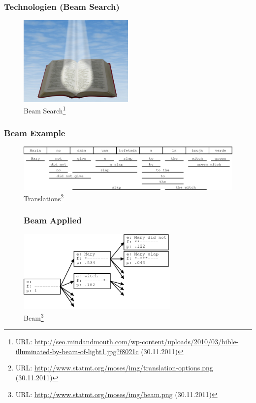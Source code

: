 \documentclass{beamer}
\begin{document}
\begin{frame}
  \frametitle{Technologien (Beam Search)}
  \begin{figure}
  \includegraphics[width=0.50\textwidth]{graphics/beam}
  \caption{Beam Search\footnote{URL: \url{http://seo.mindandmouth.com/wp-content/uploads/2010/03/bible-illuminated-by-beam-of-light1.jpg?f8021c} (30.11.2011)}}
  \end{figure}
\end{frame}
\begin{frame}
  \frametitle{Beam Example}
  \begin{figure}
  \includegraphics[width=1.00\textwidth]{graphics/translationoptions}
  \caption{Translations\footnote{URL:
      \url{http://www.statmt.org/moses/img/translation-options.png} (30.11.2011)}}
  \end{figure}
\end{frame}
\begin{frame}
  \begin{figure}
  \frametitle{Beam Applied}
  \includegraphics[width=0.70\textwidth]{graphics/beam_applied}
  \caption{Beam\footnote{URL:
      \url{http://www.statmt.org/moses/img/beam.png} (30.11.2011)}}
  \end{figure}
\end{frame}
\end{document}
